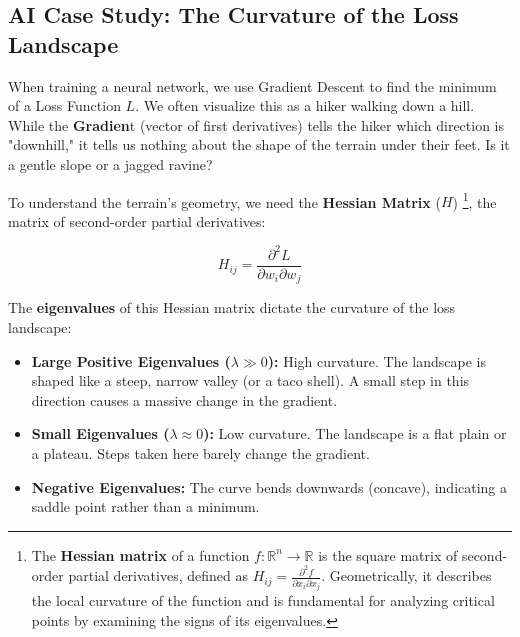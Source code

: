 \documentclass[12pt,a4paper,twoside,openright]{book}
\begin{document}
\subsection{AI Case Study: The Curvature of the Loss Landscape}

When training a neural network, we use Gradient Descent to find the minimum of a Loss Function $L$. We often visualize this as a hiker walking down a hill.
While the \textbf{Gradien}t (vector of first derivatives) tells the hiker which direction is "downhill," it tells us nothing about the shape of the terrain under their feet. Is it a gentle slope or a jagged ravine?

To understand the terrain's geometry, we need the \textbf{Hessian Matrix} ($H$) \footnote{The \textbf{Hessian matrix} of a function $f: \mathbb{R}^n \to \mathbb{R}$ is the square matrix of second-order partial derivatives, defined as $H_{ij} = \frac{\partial^2 f}{\partial x_i \partial x_j}$. Geometrically, it describes the local curvature of the function and is fundamental for analyzing critical points by examining the signs of its eigenvalues.}, the matrix of second-order partial derivatives:

\[
H_{ij} = \frac{\partial^2 L}{\partial w_i \partial w_j}
\]

The \textbf{eigenvalues} of this Hessian matrix dictate the curvature of the loss landscape:

\begin{itemize}
    \item \textbf{Large Positive Eigenvalues ($\lambda \gg 0$):} High curvature. The landscape is shaped like a steep, narrow valley (or a taco shell). A small step in this direction causes a massive change in the gradient.
    \item \textbf{Small Eigenvalues ($\lambda \approx 0$):} Low curvature. The landscape is a flat plain or a plateau. Steps taken here barely change the gradient.
    \item \textbf{Negative Eigenvalues:} The curve bends downwards (concave), indicating a saddle point rather than a minimum.
\end{itemize}
\end{document}
